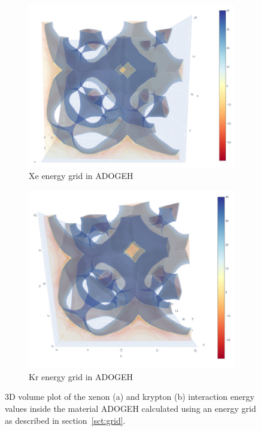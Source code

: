 \documentclass[main]{subfiles}
\begin{document}
\begin{figure}[ht]
  \centering
  \begin{subfigure}[b]{0.4\textwidth}
    \centering
    \includegraphics[width=\textwidth]{figures/5-diffusion/viz/ADOGEH_Xe.jpg}
    \caption{Xe energy grid in ADOGEH}\label{fgr:ADOGEH_Xe}
  \end{subfigure}
  \hspace{1cm}
  \begin{subfigure}[b]{0.4\textwidth}
    \centering
    \includegraphics[width=\textwidth]{figures/5-diffusion/viz/ADOGEH_Kr.jpg}
    \caption{Kr energy grid in ADOGEH}\label{fgr:ADOGEH_Kr}
  \end{subfigure}
  \caption{3D volume plot of the xenon (a) and krypton (b) interaction energy values inside the material ADOGEH\autocite{Peikert_2012} calculated using an energy grid as described in section~\ref{sct:grid}. }\label{fgr:ADOGEH}
\end{figure}
\end{document}

